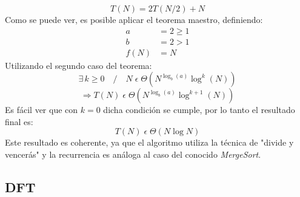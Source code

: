 \documentclass{article}
\begin{document}
    \begin{equation*}
      \boxed{T(N) = 2T(N/2) + N}
    \end{equation*}
      Como se puede ver, es posible aplicar el teorema maestro, definiendo:
    \begin{align*}
      a &= 2 \geq 1 \\
      b &= 2 > 1\\
   f(N) &= N
    \end{align*}
      Utilizando el segundo caso del teorema:
    $$ \exists\,k \geq 0 \quad / \quad N \;\epsilon\; \Theta (N^{\log_b (a)} \log^k (N)) $$
    $$ \Rightarrow T(N)\;\epsilon\;\Theta (N^{\log_b (a)} \log^{k+1} (N)) $$
      Es fácil ver que con $k=0$ dicha condición se cumple, por lo tanto
    el resultado final es:
    $$ \boxed{T(N)\;\epsilon\;\Theta (N \log N)} $$
      Este resultado es coherente, ya que el algoritmo utiliza la técnica de 
    "divide y vencerás" y la recurrencia es análoga al caso del conocido 
    \textit{MergeSort}.
    
    \subsection{DFT}
\end{document}
